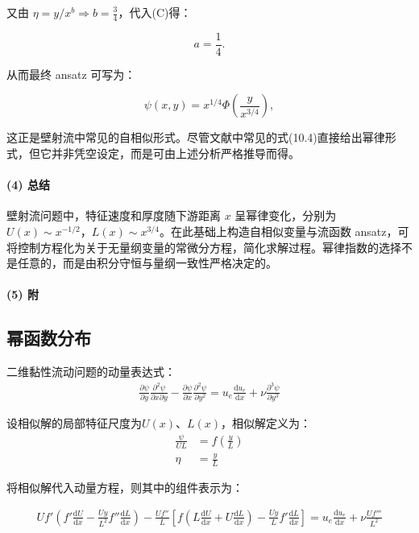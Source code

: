 又由 \( \eta = y / x^b \Rightarrow b = \frac{3}{4} \)，代入(C)得：

\begin{equation}
a = \frac{1}{4}.
\end{equation}

从而最终 ansatz 可写为：

\begin{equation}
\psi(x,y) = x^{1/4}\Phi\left( \frac{y}{x^{3/4}} \right),
\end{equation}

这正是壁射流中常见的自相似形式。尽管文献中常见的式(10.4)直接给出幂律形式，但它并非凭空设定，而是可由上述分析严格推导而得。

\paragraph{(4) 总结}

壁射流问题中，特征速度和厚度随下游距离 \( x \) 呈幂律变化，分别为 \( U(x) \sim x^{-1/2} \)，\( L(x) \sim x^{3/4} \)。在此基础上构造自相似变量与流函数 ansatz，可将控制方程化为关于无量纲变量的常微分方程，简化求解过程。幂律指数的选择不是任意的，而是由积分守恒与量纲一致性严格决定的。


\paragraph{(5) 附}
\subsection{幂函数分布}
二维黏性流动问题的动量表达式：
\begin{align}
    \frac{\partial \psi}{\partial y}\frac{\partial^{2} \psi}{\partial x\partial y} - \frac{\partial \psi}{\partial x}\frac{\partial^{2} \psi}{\partial y^{2}}=u_{e}\frac{\mathrm{d}u_{e}}{\mathrm{d}x}+\nu\frac{\partial^{3} \psi}{\partial y^{3}}
\end{align}

设相似解的局部特征尺度为$U(x)$、$L(x)$，相似解定义为：
\begin{align}
    \frac{\psi}{UL}&=f(\frac{y}{L})\\
    \eta&=\frac{y}{L}
\end{align}

将相似解代入动量方程，则其中的组件表示为：


\begin{align}
    Uf'\left (f'\frac{\mathrm{d}U}{\mathrm{d}x}-\frac{Uy}{L^{2}}f''\frac{\mathrm{d}L}{\mathrm{d}x} 
    \right)-\frac{Uf''}{L}\left[f\left(L\frac{\mathrm{d}U}{\mathrm{d}x}+U\frac{\mathrm{d}L}{\mathrm{d}x}\right)-\frac{Uy}{L}f'\frac{\mathrm{d}L}{\mathrm{d}x}
    \right]=u_{e}\frac{\mathrm{d}u_{e}}{\mathrm{d}x}+\nu\frac{Uf'''}{L^{2}}
\end{align}

